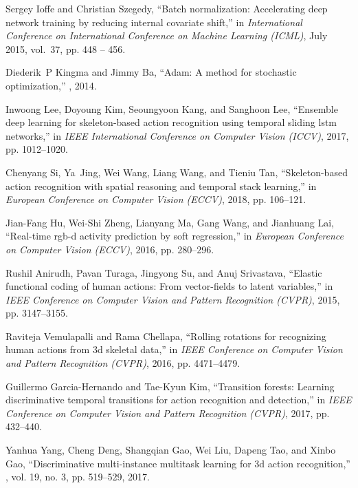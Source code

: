 \documentclass[conference]{IEEEtran}
\begin{document}
\begin{thebibliography}{10}
  Sergey Ioffe and Christian Szegedy,
  \newblock ``Batch normalization: Accelerating deep network training by reducing
    internal covariate shift,''
  \newblock in {\em International Conference on International Conference on
    Machine Learning (ICML)}, July 2015, vol.~37, pp. 448 -- 456.
  
  Diederik~P Kingma and Jimmy Ba,
  \newblock ``Adam: A method for stochastic optimization,''
  , 2014.
  
  Inwoong Lee, Doyoung Kim, Seoungyoon Kang, and Sanghoon Lee,
  \newblock ``Ensemble deep learning for skeleton-based action recognition using
    temporal sliding lstm networks,''
  \newblock in {\em IEEE International Conference on Computer Vision (ICCV)},
    2017, pp. 1012--1020.
  
  Chenyang Si, Ya~Jing, Wei Wang, Liang Wang, and Tieniu Tan,
  \newblock ``Skeleton-based action recognition with spatial reasoning and
    temporal stack learning,''
  \newblock in {\em European Conference on Computer Vision (ECCV)}, 2018, pp.
    106--121.
  
  Jian-Fang Hu, Wei-Shi Zheng, Lianyang Ma, Gang Wang, and Jianhuang Lai,
  \newblock ``Real-time rgb-d activity prediction by soft regression,''
  \newblock in {\em European Conference on Computer Vision (ECCV)}, 2016, pp.
    280--296.
  
  Rushil Anirudh, Pavan Turaga, Jingyong Su, and Anuj Srivastava,
  \newblock ``Elastic functional coding of human actions: From vector-fields to
    latent variables,''
  \newblock in {\em IEEE Conference on Computer Vision and Pattern Recognition
    (CVPR)}, 2015, pp. 3147--3155.
  
  Raviteja Vemulapalli and Rama Chellapa,
  \newblock ``Rolling rotations for recognizing human actions from 3d skeletal
    data,''
  \newblock in {\em IEEE Conference on Computer Vision and Pattern Recognition
    (CVPR)}, 2016, pp. 4471--4479.
  
  Guillermo Garcia-Hernando and Tae-Kyun Kim,
  \newblock ``Transition forests: Learning discriminative temporal transitions
    for action recognition and detection,''
  \newblock in {\em IEEE Conference on Computer Vision and Pattern Recognition
    (CVPR)}, 2017, pp. 432--440.
  
  Yanhua Yang, Cheng Deng, Shangqian Gao, Wei Liu, Dapeng Tao, and Xinbo Gao,
  \newblock ``Discriminative multi-instance multitask learning for 3d action
    recognition,''
  , vol. 19, no. 3, pp.
    519--529, 2017.
  
  \end{thebibliography}
  
\end{document}

